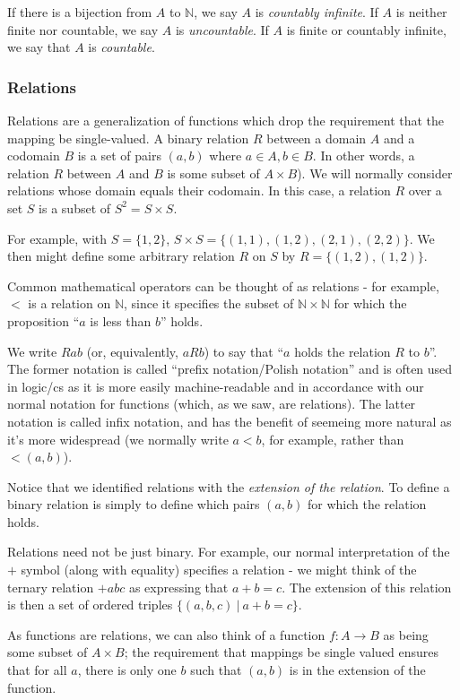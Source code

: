 If there is a bijection from $A$ to $\mathbb{N}$, we say $A$ is \emph{countably infinite}. If $A$ is neither finite nor countable, we say $A$ is \emph{uncountable}. If $A$ is finite or countably infinite, we say that $A$ is \emph{countable}. 

\subsubsection*{Relations}
Relations are a generalization of functions which drop the requirement that the mapping be single-valued. A binary relation $R$ between a domain $A$ and a codomain $B$ is a set of pairs $(a, b)$ where $a \in A, b \in B$. In other words, a relation $R$ between $A$ and $B$ is some subset of $A \times B$). We will normally consider relations whose domain equals their codomain. In this case, a relation $R$ over a set $S$ is a subset of $S^2 = S \times S$. 

For example, with $S = \{1, 2\}$, $S \times S = \{(1, 1), (1, 2), (2, 1), (2, 2)\}$. We then might define some arbitrary relation $R$ on $S$ by $R = \{(1, 2), (1, 2)\}$.

Common mathematical operators can be thought of as relations - for example, $<$ is a relation on $\mathbb{N}$, since it specifies the subset of $\mathbb{N} \times \mathbb{N}$ for which the proposition ``$a$ is less than $b$'' holds.

We write $Rab$ (or, equivalently, $aRb$) to say that ``$a$ holds the relation $R$ to $b$''. The former notation is called ``prefix notation/Polish notation'' and is often used in logic/cs as it is more easily machine-readable and in accordance with our normal notation for functions (which, as we saw, are relations). The latter notation is called infix notation, and has the benefit of seemeing more natural as it's more widespread (we normally write $a < b$, for example, rather than ${<}(a, b)$). 

Notice that we identified relations with the \emph{extension of the relation}. To define a binary relation is simply to define which pairs $(a, b)$ for which the relation holds. 

Relations need not be just binary. For example, our normal interpretation of the $+$ symbol (along with equality) specifies a relation - we might think of the ternary relation $+abc$ as expressing that $a + b = c$. The extension of this relation is then a set of ordered triples $\{(a, b, c)\ |\ a + b = c\}$. 

As functions are relations, we can also think of a function $f: A \rightarrow B$ as being some subset of $A \times B$; the requirement that mappings be single valued ensures that for all $a$, there is only one $b$ such that $(a, b)$ is in the extension of the function. 

